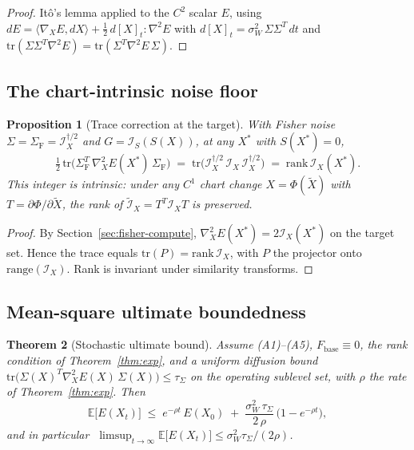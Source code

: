 \documentclass[11pt,oneside]{amsart}
\theoremstyle{plain}
\newtheorem{theorem}{Theorem}[section]
\newtheorem{proposition}[theorem]{Proposition}
\theoremstyle{definition}
\newcommand{\Fbase}{F_{\mathrm{base}}}
\begin{document}
\begin{proof}
It\^o's lemma applied to the $C^2$ scalar $E$, using
$dE = \langle\nabla_X E, dX\rangle + \tfrac12\,d[X]_t : \nabla^2 E$
with $d[X]_t = \sigma_W^2\,\Sigma\Sigma^T\,dt$ and
$\mathrm{tr}(\Sigma\Sigma^T\nabla^2 E)=\mathrm{tr}(\Sigma^T\nabla^2 E\,\Sigma)$.
\end{proof}

\subsection{The chart-intrinsic noise floor}

\begin{proposition}[Trace correction at the target]
\label{prop:trace-floor}
With Fisher noise $\Sigma=\Sigma_{\mathrm F}=\mathcal{I}_X^{\dagger/2}$
and $G=\mathcal{I}_S(S(X))$, at any $X^{*}$ with $S(X^{*})=0$,
\[
  \tfrac{1}{2}\,\mathrm{tr}\!\bigl(\Sigma_{\mathrm F}^{T}\,\nabla^{2}_{X}E(X^{*})\,\Sigma_{\mathrm F}\bigr)
  \;=\; \mathrm{tr}\!\bigl(\mathcal{I}_X^{\dagger/2}\,\mathcal{I}_X\,\mathcal{I}_X^{\dagger/2}\bigr)
  \;=\; \mathrm{rank}\,\mathcal{I}_X(X^{*}).
\]
This integer is intrinsic: under any $C^1$ chart change $X=\Phi(\widetilde X)$
with $T=\partial\Phi/\partial\widetilde X$, the rank of
$\widetilde{\mathcal{I}}_X = T^T \mathcal{I}_X T$ is preserved.
\end{proposition}

\begin{proof}
By Section~\ref{sec:fisher-compute}, $\nabla^{2}_{X}E(X^{*})=2\mathcal{I}_X(X^{*})$
on the target set. Hence the trace equals
$\mathrm{tr}(P)=\mathrm{rank}\,\mathcal{I}_X$, with $P$ the projector
onto $\mathrm{range}(\mathcal{I}_X)$. Rank is invariant under
similarity transforms.
\end{proof}

\subsection{Mean-square ultimate boundedness}

\begin{theorem}[Stochastic ultimate bound]
\label{thm:sde-bound}
Assume \textup{(A1)--(A5)}, $\Fbase\equiv 0$, the rank condition of
Theorem~\ref{thm:exp}, and a uniform diffusion bound
\(
  \mathrm{tr}\bigl(\Sigma(X)^{T}\nabla^{2}_{X}E(X)\,\Sigma(X)\bigr) \le \tau_{\Sigma}
\)
on the operating sublevel set, with $\rho$ the rate of
Theorem~\ref{thm:exp}. Then
\[
  \boxed{\;
    \mathbb{E}\bigl[E(X_t)\bigr]
    \;\le\; e^{-\rho t}\,E(X_0)
          \;+\; \frac{\sigma_W^{2}\,\tau_{\Sigma}}{2\,\rho}
          \,\bigl(1 - e^{-\rho t}\bigr),
  \;}
\]
and in particular
$\;\limsup_{t\to\infty}\mathbb{E}\bigl[E(X_t)\bigr]\le \sigma_W^{2}\tau_{\Sigma}/(2\rho)$.
\end{theorem}
\end{document}

